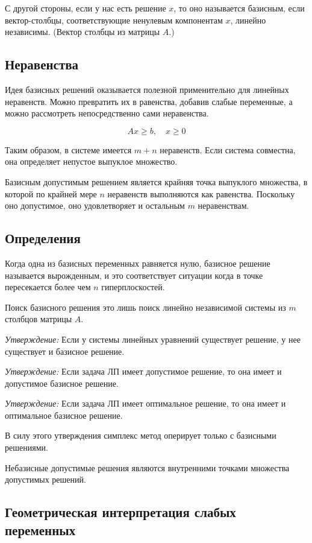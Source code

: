 \documentclass[a4paper,article,14pt]{extarticle}
\begin{document}
С другой стороны, если у нас есть решение \(x\), то оно называется базисным, если вектор-столбцы, соответствующие ненулевым компонентам \(x\), линейно независимы.
(Вектор столбцы из матрицы \(A\).)

\subsection{Неравенства}

Идея базисных решений оказывается полезной применительно для линейных неравенств.
Можно превратить их в равенства, добавив слабые переменные, а можно рассмотреть непосредственно сами неравенства.

\begin{equation}
    Ax \ge b, \quad x \ge 0
\end{equation}

Таким образом, в системе имеется \(m + n\) неравенств.
Если система совместна, она определяет непустое выпуклое множество.

Базисным допустимым решением является крайняя точка выпуклого множества, в которой по крайней мере \(n\) неравенств выполняются как равенства.
Поскольку оно допустимое, оно удовлетворяет и остальным \(m\) неравенствам.

\subsection{Определения}

Когда одна из базисных переменных равняется нулю, базисное решение называется вырожденным, и это соответствует ситуации когда в точке пересекается более чем \(n\) гиперплоскостей.

Поиск базисного решения это лишь поиск линейно независимой системы из \(m\) столбцов матрицы \(A\).

\textit{Утверждение:} Если у системы линейных уравнений существует решение, у нее существует и базисное решение.

\textit{Утверждение:} Если задача ЛП имеет допустимое решение, то она имеет и допустимое базисное решение.

\textit{Утверждение:} Если задача ЛП имеет оптимальное решение, то она имеет и оптимальное базисное решение.

В силу этого утверждения симплекс метод оперирует только с базисными решениями.

Небазисные допустимые решения являются внутренними точками множества допустимых решений.

\subsection{Геометрическая интерпретация слабых переменных}
\end{document}
